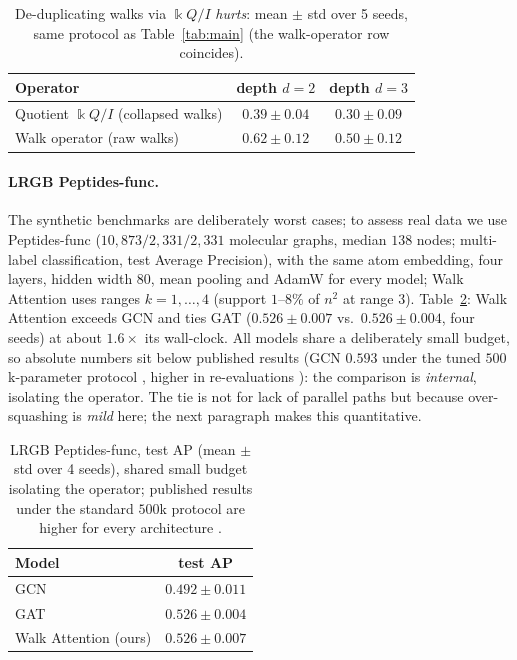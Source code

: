 \documentclass[runningheads]{llncs}
\newcommand{\kk}{\Bbbk}
\newcommand{\kQ}{\kk Q}
\begin{document}
\begin{table}[t]
\centering
\caption{De-duplicating walks via $\kQ/I$ \emph{hurts}: mean $\pm$ std over 5
seeds, same protocol as Table~\ref{tab:main} (the walk-operator row coincides).}
\label{tab:quotient}
\begin{tabular}{lcc}
\toprule
\textbf{Operator} & \textbf{depth $d=2$} & \textbf{depth $d=3$} \\
\midrule
Quotient $\kQ/I$ (collapsed walks) & $0.39\pm0.04$ & $0.30\pm0.09$ \\
Walk operator (raw walks)          & $\mathbf{0.62\pm0.12}$ & $\mathbf{0.50\pm0.12}$ \\
\bottomrule
\end{tabular}
\end{table}

\paragraph{LRGB Peptides-func.}
The synthetic benchmarks are deliberately worst cases; to assess real data we
use Peptides-func \cite{dwivedi2022lrgb} ($10{,}873/2{,}331/2{,}331$ molecular
graphs, median $138$ nodes; multi-label classification, test Average
Precision), with the same atom embedding, four layers, hidden width $80$, mean
pooling and AdamW for every model; Walk Attention uses ranges $k=1,\dots,4$
(support $1$--$8\%$ of $n^2$ at range $3$). Table~\ref{tab:lrgb}: Walk
Attention exceeds GCN and ties GAT ($0.526\pm0.007$ vs.\ $0.526\pm0.004$, four
seeds) at about $1.6\times$ its wall-clock. All models share a deliberately
small budget, so absolute numbers sit below published results (GCN $0.593$
under the tuned $500$k-parameter protocol \cite{dwivedi2022lrgb}, higher in
re-evaluations \cite{tonshoff2023where}): the comparison is \emph{internal},
isolating the operator. The tie is not for lack of parallel paths but because
over-squashing is \emph{mild} here; the next paragraph makes this
quantitative.

\begin{table}[t]
\centering
\caption{LRGB Peptides-func, test AP (mean $\pm$ std over 4 seeds), shared
small budget isolating the operator; published results under the standard
$500$k protocol are higher for every architecture
\cite{dwivedi2022lrgb,tonshoff2023where}.}
\label{tab:lrgb}
\begin{tabular}{lc}
\toprule
\textbf{Model} & \textbf{test AP} \\
\midrule
GCN                          & $0.492\pm0.011$ \\
GAT                          & $0.526\pm0.004$ \\
Walk Attention (ours)        & $0.526\pm0.007$ \\
\bottomrule
\end{tabular}
\end{table}
\end{document}
